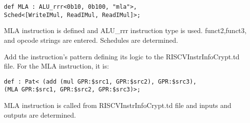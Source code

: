 \begin{lstlisting}
def MLA : ALU_rrr<0b10, 0b100, "mla">,
Sched<[WriteIMul, ReadIMul, ReadIMul]>;
\end{lstlisting}

MLA instruction is defined and ALU\_rrr instruction type is used. funct2,funct3, and opcode strings are entered. Schedules are determined.

Add the instruction’s pattern defining its logic to the RISCVInstrInfoCrypt.td file. For the MLA instruction, it is:

\begin{lstlisting}
def : Pat< (add (mul GPR:$src1, GPR:$src2), GPR:$src3),
(MLA GPR:$src1, GPR:$src2, GPR:$src3)>;
\end{lstlisting}

MLA instruction is called from RISCVInstrInfoCrypt.td file and inputs and outputs are determined.
